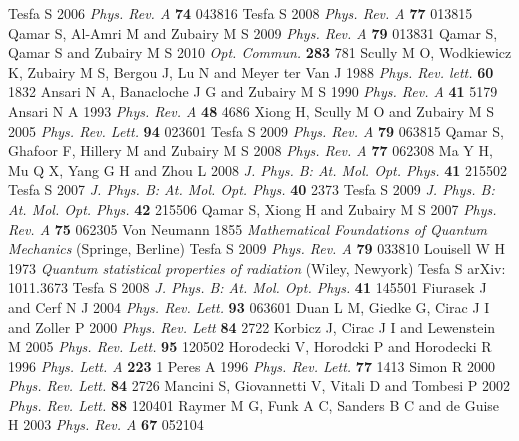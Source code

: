 \documentclass[twocolumn,showpacs,preprintnumbers,amsmath,amssymb,pra]{revtex4}
\begin{document}
\begin{thebibliography}{1}
 Tesfa S 2006 {\it{Phys. Rev. A}} {\bf{74}}   043816
  Tesfa S 2008 {\it{Phys. Rev. A}} {\bf{77}} 013815 
  Qamar S,  Al-Amri M and  Zubairy M S 2009 {\it{Phys. Rev. A}} {\bf{79}} 013831 
  Qamar S,  Qamar S and  Zubairy M S 2010 {\it{Opt. Commun.}} {\bf{283}} 781 
  Scully M O,  Wodkiewicz K,  Zubairy M S,  Bergou J,  Lu N and  Meyer ter Van J  1988 {\it{Phys. Rev. lett.}} {\bf{60}}   1832
  Ansari N A, Banacloche J G and  Zubairy M S 1990 {\it{Phys. Rev. A}} {\bf{41}}   5179
  Ansari N A 1993 {\it{Phys. Rev. A}} {\bf{48}}   4686
  Xiong H,  Scully M O and  Zubairy M S 2005 {\it{Phys. Rev. Lett.}} {\bf{94}} 023601
  Tesfa S 2009 {\it{Phys. Rev. A}} {\bf{79}} 063815 
  Qamar S,  Ghafoor F,  Hillery M and  Zubairy M S 2008 {\it{Phys. Rev. A}} {\bf{77}} 062308 
  Ma Y H,  Mu Q X,  Yang G H and  Zhou L 2008 {\it{J. Phys. B: At. Mol. Opt. Phys.}} {\bf{41}} 215502 
  Tesfa S 2007 {\it{J. Phys. B: At. Mol. Opt. Phys.}} {\bf{40}}   2373 
  Tesfa S 2009 {\it{J. Phys. B: At. Mol. Opt. Phys.}} {\bf{42}} 215506 
  Qamar S,  Xiong H and  Zubairy M S 2007 {\it{Phys. Rev. A}} {\bf{75}} 062305 
 Von Neumann 1855 {\it{Mathematical Foundations of Quantum Mechanics}} (Springe, Berline)
  Tesfa S 2009 {\it{Phys. Rev. A}} {\bf{79}} 033810 
  Louisell W H 1973 {\it{Quantum statistical properties of radiation}} (Wiley, Newyork)
  Tesfa S arXiv: 1011.3673
  Tesfa S 2008 {\it{J. Phys. B: At. Mol. Opt. Phys.}} {\bf{41}} 145501
  Fiurasek J and  Cerf N J 2004 {\it{Phys. Rev. Lett.}} {\bf{93}}  063601
  Duan L M,  Giedke G,  Cirac J I and  Zoller P 2000 {\it{Phys. Rev. Lett}} {\bf{84}}   2722
  Korbicz J,  Cirac J I and  Lewenstein M 2005 {\it{Phys. Rev. Lett.}} {\bf{95}} 120502
  Horodecki V,  Horodcki P and  Horodecki R 1996 {\it{Phys. Lett. A}} {\bf{223}} 1 
  Peres A 1996 {\it{Phys. Rev. Lett.}} {\bf{77}} 1413 
  Simon R 2000 {\it{Phys. Rev. Lett.}} {\bf{84}} 2726 
  Mancini S,  Giovannetti V,  Vitali D and  Tombesi P 2002 {\it{Phys. Rev. Lett.}} {\bf{88}} 120401 
  Raymer M G,  Funk A C,  Sanders B C and  de Guise H 2003 {\it{Phys. Rev. A}} {\bf{67}} 052104 

\end{thebibliography}
\end{document}
